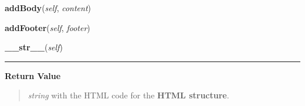     \label{module_Web:HTML:addBody}

    \vspace{0.5ex}

\hspace{.8\funcindent}\begin{boxedminipage}{\funcwidth}

    \raggedright \textbf{addBody}(\textit{self}, \textit{content})

\setlength{\parskip}{2ex}
\setlength{\parskip}{1ex}
    \end{boxedminipage}

    \label{module_Web:HTML:addFooter}

    \vspace{0.5ex}

\hspace{.8\funcindent}\begin{boxedminipage}{\funcwidth}

    \raggedright \textbf{addFooter}(\textit{self}, \textit{footer})

\setlength{\parskip}{2ex}
\setlength{\parskip}{1ex}
    \end{boxedminipage}

    \label{module_Web:HTML:__str__}

    \vspace{0.5ex}

\hspace{.8\funcindent}\begin{boxedminipage}{\funcwidth}

    \raggedright \textbf{\_\_str\_\_}(\textit{self})

    \vspace{-1.5ex}

    \rule{\textwidth}{0.5\fboxrule}
\setlength{\parskip}{2ex}
\setlength{\parskip}{1ex}
      \textbf{Return Value}
    \vspace{-1ex}

      \begin{quote}

\emph{string} with the HTML code for the \textbf{HTML structure}.
      \end{quote}

    \end{boxedminipage}


